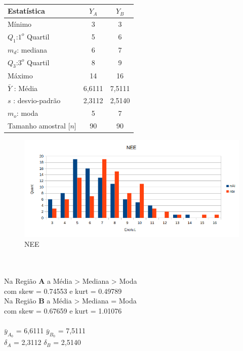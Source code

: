 \\
\begin{minipage}[!b]{0.40\linewidth}
\begin{tabular}{ l c c }
\hline
Estatística & $Y_A$ & $Y_B$ \\
\hline
Mínimo & 3 & 3 \\
$Q_1$:$1^o$ Quartil & 5 & 6 \\
$m_d$: mediana & 6 & 7 \\
$Q_3$:$3^o$ Quartil & 8 & 9 \\
Máximo & 14 & 16 \\
\hline
$\bar{Y}$ : Média & 6,6111 & 7,5111 \\
$s$ : desvio-padrão & 2,3112 & 2,5140\\
$m_o$: moda & 5 & 7\\
\hline
Tamanho amostral [$n$] & 90 & 90 \\
\hline
\end{tabular}
\label{Tab:Resulatdos}
\end{minipage}
\hspace{1.8cm}
\begin{minipage}[!b]{0.40\linewidth}
\begin{figure}[H]
\centering
\includegraphics[scale=0.5]{./image/NEE.png}
\caption{NEE}
\label{NEE}
\end{figure}
\end{minipage}
\\
\\
\noindent
Na Região \textbf{A} a Média > Mediana > Moda \\ 
com skew = 0.74553  e kurt = 0.49789 \\
Na Região \textbf{B} a Média > Mediana = Moda \\
com skew = 0.67659 e kurt = 1.01076 \\
\\
$\bar{y}_{A_0}$ = 6,6111 \qquad $\bar{y}_{B_0}$ = 7,5111 \\
$\delta_A$ = 2,3112 \qquad $\delta_B$ = 2,5140 \\

